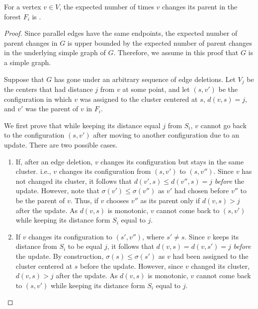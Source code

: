 \begin{lemma} \label{lem:parent_change}
For a vertex \( v \in V \), the expected number of times \( v \) changes its parent in the forest \( F_i \) is .
\end{lemma}

\begin{proof}

Since parallel edges have the same endpoints, the expected number of parent changes in \( G \) is upper bounded by the expected number of parent changes in the underlying simple graph of \( G \).
Therefore, we assume in this proof that \( G \) is a simple graph.

Suppose that \( G \) has gone under an arbitrary sequence of edge deletions.
Let \( V_j \) be the centers that had distance \( j \) from \( v \) at some point, and let \( (s, v') \) be the configuration in which \( v \) was assigned to the cluster centered at \( s \), \( d(v, s) = j \), and \( v' \) was the parent of \( v \) in \( F_i \).

We first prove that while keeping its distance equal \( j \) from \( S_i \), \( v \) cannot go back to the configuration \( (s, v') \) after moving to another configuration due to an update.
There are two possible cases.
\begin{enumerate}
\item 
If, after an edge deletion, \( v \) changes its configuration but stays in the same cluster.
i.e., \( v \) changes its configuration from \( (s, v') \) to \( (s, v'') \).
Since \( v \) has not changed its cluster, it follows that \( d(v', s) \leq d(v'', s) = j \) \textit{before} the update.
However, note that \( \sigma ( v' ) \leq \sigma ( v'' ) \) as \( v' \) had chosen before \( v'' \) to be the parent of \( v \).
Thus, if \( v \) chooses \( v'' \) as its parent only if \( d( v, s ) > j \) after the update.
As \( d(v, s) \) is monotonic, \( v \) cannot come back to \( (s, v') \) while keeping its distance form \( S_i \) equal to \( j \).

\item
If \( v \) changes its configuration to \( (s', v'') \), where \( s' \neq s \).
Since \( v \) keeps its distance from \( S_i \) to be equal \( j \), it follows that \( d(v, s) = d(v, s') = j \) \textit{before} the update.
By construction, \( \sigma ( s ) \leq \sigma ( s' ) \) as \( v \) had been assigned to the cluster centered at \( s \) before the update.
However, since \( v \) changed its cluster, \( d( v, s ) > j \) after the update.
As \( d(v, s) \) is monotonic, \( v \) cannot come back to \( (s, v') \) while keeping its distance form \( S_i \) equal to \( j \).
\end{enumerate}




\end{proof}
